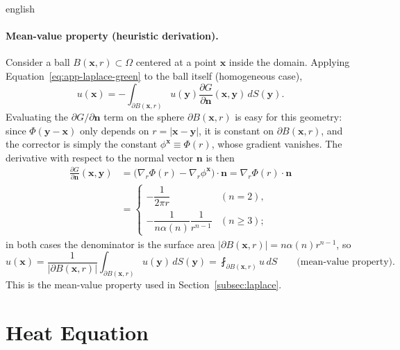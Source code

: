 \documentclass[11pt,letterpaper,twoside,openright]{book} %
\newcommand{\abs}[1]{\left\lvert #1 \right\rvert}
\begin{document}
\begin{hyphenrules}{english}
\paragraph{Mean-value property (heuristic derivation).}
Consider a ball $B(\mathbf{x},r)\subset\Omega$ centered at a point $\mathbf{x}$ inside the domain. Applying
Equation~\eqref{eq:app-laplace-green} to the ball itself (homogeneous case),
\begin{equation}
  u(\mathbf{x})=-\int_{\partial B(\mathbf{x},r)}u(\mathbf{y})\frac{\partial G}{\partial\mathbf{n}}(\mathbf{x},\mathbf{y})\,d S(\mathbf{y}).
  \label{eq:mvp-1}
\end{equation}
Evaluating the $\partial G/\partial\mathbf{n}$ term on the sphere $\partial B(\mathbf{x},r)$ is easy for this geometry:
since $\Phi(\mathbf{y}-\mathbf{x})$ only depends on $r=\abs{\mathbf{x}-\mathbf{y}}$, it is constant on $\partial B(\mathbf{x},r)$, and the
corrector is simply the constant $\phi^{\mathbf{x}}\equiv\Phi(r)$, whose gradient vanishes. The derivative with
respect to the normal vector $\mathbf{n}$ is then
\begin{align}
  \frac{\partial G}{\partial\mathbf{n}}(\mathbf{x},\mathbf{y})
    &=\big(\nabla_r\Phi(r)-\nabla_r\phi^{\mathbf{x}}\big)\cdot\mathbf{n}=\nabla_r\Phi(r)\cdot\mathbf{n} \label{eq:mvp-2}\\
    &=\begin{cases}
        -\dfrac{1}{2\pi r} & (n=2),\\[2mm]
        -\dfrac{1}{n\alpha(n)}\dfrac{1}{r^{n-1}} & (n\ge3);
      \end{cases} \label{eq:mvp-3}
\end{align}
in both cases the denominator is the surface area $\abs{\partial B(\mathbf{x},r)}=n\alpha(n)r^{n-1}$, so
\begin{equation}
  u(\mathbf{x})=\frac{1}{\abs{\partial B(\mathbf{x},r)}}\int_{\partial B(\mathbf{x},r)}u(\mathbf{y})\,d S(\mathbf{y})
  =\fint_{\partial B(\mathbf{x},r)}u\,d S \qquad\text{(mean-value property)}.
  \label{eq:app-mvp}
\end{equation}
This is the mean-value property used in Section~\ref{subsec:laplace}.

\section{Heat Equation}\label{app-sec:heat}


\end{hyphenrules}
\end{document}
